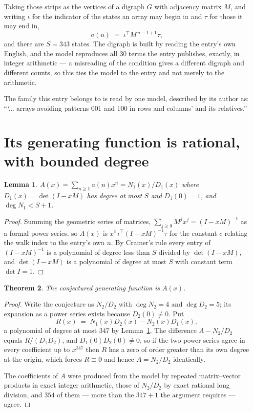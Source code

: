 \documentclass[11pt,a4paper]{article}
\theoremstyle{plain}
\newtheorem{theorem}{Theorem}
\newtheorem{lemma}[theorem]{Lemma}
\theoremstyle{definition}
\begin{document}
Taking those strips as the vertices of a digraph $G$ with adjacency matrix $M$, and writing
$\iota$ for the indicator of the states an array may begin in and $\tau$ for those it may end
in,
\[
a(n)\;=\;\iota^{\!\top}M^{\,n-1+1}\tau ,
\]
and there are $S=343$ states. The digraph is built by reading the entry's own English, and the
model reproduces all $30$ terms the entry publishes, exactly, in integer arithmetic --- a
misreading of the condition gives a different digraph and different counts, so this ties the
model to the entry and not merely to the arithmetic.

The family this entry belongs to is read by one model, described by its author as: ```... arrays avoiding patterns 001 and 100 in rows and columns' and its relatives.''


\section{Its generating function is rational, with bounded degree}

\begin{lemma}\label{lem:rat}
$A(x)=\sum_{n\ge1}a(n)x^n=N_1(x)/D_1(x)$ where $D_1(x)=\det(I-xM)$ has degree at most
$S$ and $D_1(0)=1$, and $\deg N_1<S+1$.
\end{lemma}

\begin{proof}
Summing the geometric series of matrices, $\sum_{j\ge0}M^jx^j=(I-xM)^{-1}$ as a formal
power series, so $A(x)$ is $x^{c}\,\iota^{\!\top}(I-xM)^{-1}\tau$ for the constant $c$
relating the walk index to the entry's own $n$. By Cramer's rule every entry of
$(I-xM)^{-1}$ is a polynomial of degree less than $S$ divided by $\det(I-xM)$, and
$\det(I-xM)$ is a polynomial of degree at most $S$ with constant term $\det I=1$.
\end{proof}

\begin{theorem}
The conjectured generating function is $A(x)$.
\end{theorem}

\begin{proof}
Write the conjecture as $N_2/D_2$ with $\deg N_2=4$ and $\deg D_2=5$; its expansion as a
power series exists because $D_2(0)\neq0$. Put
\[
R(x)\;=\;N_1(x)D_2(x)-N_2(x)D_1(x),
\]
a polynomial of degree at most $347$ by Lemma~\ref{lem:rat}. The difference
$A-N_2/D_2$ equals $R/(D_1D_2)$, and $D_1(0)D_2(0)\neq0$, so if the two power series agree in
every coefficient up to $x^{347}$ then $R$ has a zero of order greater than its own
degree at the origin, which forces $R\equiv0$ and hence $A=N_2/D_2$ identically.

The coefficients of $A$ were produced from the model by repeated matrix--vector products in
exact integer arithmetic, those of $N_2/D_2$ by exact rational long division, and $354$
of them --- more than the $347+1$ the argument requires --- agree.
\end{proof}
\end{document}
